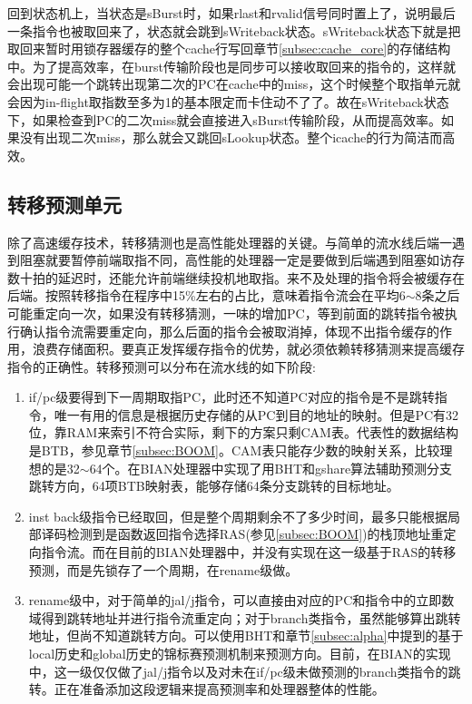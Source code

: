 回到状态机上，当状态是sBurst时，如果rlast和rvalid信号同时置上了，说明最后一条指令也被取回来了，状态就会跳到sWriteback状态。sWriteback状态下就是把取回来暂时用锁存器缓存的整个cache行写回章节\ref{subsec:cache_core}的存储结构中。为了提高效率，在burst传输阶段也是同步可以接收取回来的指令的，这样就会出现可能一个跳转出现第二次的PC在cache中的miss，这个时候整个取指单元就会因为in-flight取指数至多为1的基本限定而卡住动不了了。故在sWriteback状态下，如果检查到PC的二次miss就会直接进入sBurst传输阶段，从而提高效率。如果没有出现二次miss，那么就会又跳回sLookup状态。整个icache的行为简洁而高效。

\subsection{转移预测单元}
除了高速缓存技术，转移猜测也是高性能处理器的关键。与简单的流水线后端一遇到阻塞就要暂停前端取指不同，高性能的处理器一定是要做到后端遇到阻塞如访存数十拍的延迟时，还能允许前端继续投机地取指。来不及处理的指令将会被缓存在后端。按照转移指令在程序中15\%左右的占比，意味着指令流会在平均6$ \sim $8条之后可能重定向一次，如果没有转移猜测，一味的增加PC，等到前面的跳转指令被执行确认指令流需要重定向，那么后面的指令会被取消掉，体现不出指令缓存的作用，浪费存储面积。要真正发挥缓存指令的优势，就必须依赖转移猜测来提高缓存指令的正确性。转移预测可以分布在流水线的如下阶段:
\begin{enumerate}[label=(\alph*)]
	\item if/pc级要得到下一周期取指PC，此时还不知道PC对应的指令是不是跳转指令，唯一有用的信息是根据历史存储的从PC到目的地址的映射。但是PC有32位，靠RAM来索引不符合实际，剩下的方案只剩CAM表。代表性的数据结构是BTB，参见章节\ref{subsec:BOOM}。CAM表只能存少数的映射关系，比较理想的是32$ \sim $64个。在BIAN处理器中实现了用BHT和gshare算法辅助预测分支跳转方向，64项BTB映射表，能够存储64条分支跳转的目标地址。
	\item inst back级指令已经取回，但是整个周期剩余不了多少时间，最多只能根据局部译码检测到是函数返回指令选择RAS(参见\ref{subsec:BOOM})的栈顶地址重定向指令流。而在目前的BIAN处理器中，并没有实现在这一级基于RAS的转移预测，而是先锁存了一个周期，在rename级做。
	\item rename级中，对于简单的jal/j指令，可以直接由对应的PC和指令中的立即数域得到跳转地址并进行指令流重定向；对于branch类指令，虽然能够算出跳转地址，但尚不知道跳转方向。可以使用BHT和章节\ref{subsec:alpha}中提到的基于local历史和global历史的锦标赛预测机制来预测方向。目前，在BIAN的实现中，这一级仅仅做了jal/j指令以及对未在if/pc级未做预测的branch类指令的跳转。正在准备添加这段逻辑来提高预测率和处理器整体的性能。
\end{enumerate}

